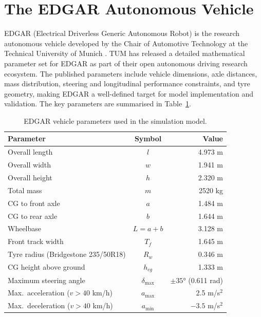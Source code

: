 \documentclass[a4paper,12pt]{report}
\begin{document}
\section{The EDGAR Autonomous Vehicle}

EDGAR (Electrical Driverless Generic Autonomous Robot) is the research
autonomous vehicle developed by the Chair of Automotive Technology at the
Technical University of Munich \cite{edgar}. TUM has released a detailed
mathematical parameter set for EDGAR as part of their open autonomous driving
research ecosystem. The published parameters include vehicle dimensions, axle
distances, mass distribution, steering and longitudinal performance constraints,
and tyre geometry, making EDGAR a well-defined target for model implementation
and validation. The key parameters are summarised in Table~\ref{table:edgar_params}.

\begin{table}[h]
\centering
\caption{EDGAR vehicle parameters used in the simulation model.}
\begin{tabular}{|l|c|r|}
\hline
\textbf{Parameter} & \textbf{Symbol} & \textbf{Value} \\ \hline
Overall length                           & $l$            & 4.973 m               \\ \hline
Overall width                            & $w$            & 1.941 m               \\ \hline
Overall height                           & $h$            & 2.320 m               \\ \hline
Total mass                               & $m$            & 2520 kg               \\ \hline
CG to front axle                         & $a$            & 1.484 m               \\ \hline
CG to rear axle                          & $b$            & 1.644 m               \\ \hline
Wheelbase                                & $L = a + b$    & 3.128 m               \\ \hline
Front track width                        & $T_f$          & 1.645 m               \\ \hline
Tyre radius (Bridgestone 235/50R18)      & $R_w$          & 0.346 m               \\ \hline
CG height above ground                   & $h_{cg}$       & 1.333 m               \\ \hline
Maximum steering angle                   & $\delta_{\max}$& $\pm35°$ (0.611 rad)  \\ \hline
Max.\ acceleration ($v > 40$ km/h)       & $a_{\max}$     & 2.5 m/s$^2$           \\ \hline
Max.\ deceleration ($v > 40$ km/h)       & $a_{\min}$     & $-3.5$ m/s$^2$        \\ \hline
\end{tabular}
\label{table:edgar_params}
\end{table}
\end{document}

